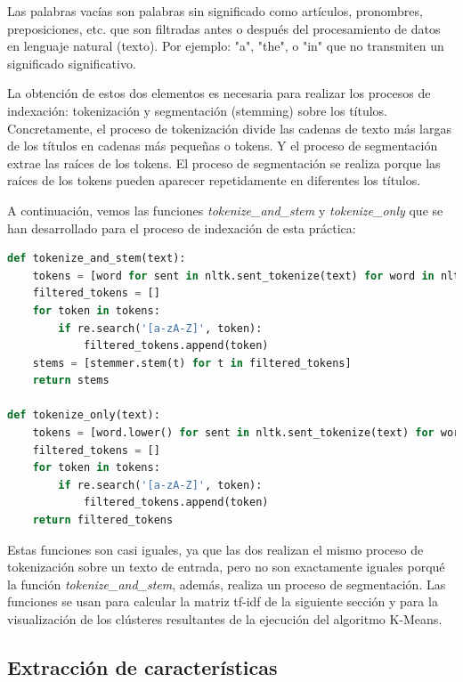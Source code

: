 \documentclass{uimppracticas}
\begin{document}
\begin{definition}\label{palabras_vacías}
	Las palabras vacías son palabras sin significado como artículos, pronombres, preposiciones, etc. que son filtradas antes o después del procesamiento de datos en lenguaje natural (texto). Por ejemplo: "a", "the", o "in" que no transmiten un significado significativo.
\end{definition}

La obtención de estos dos elementos es necesaria para realizar los procesos de indexación: tokenización y segmentación (stemming) sobre los títulos. Concretamente, el proceso de tokenización divide las cadenas de texto más largas de los títulos en cadenas más pequeñas o tokens. Y el proceso de segmentación extrae las raíces de los tokens. El proceso de segmentación se realiza porque las raíces de los tokens pueden aparecer repetidamente en diferentes los títulos.

A continuación, vemos las funciones \textit{tokenize\_and\_stem} y \textit{tokenize\_only} que se han desarrollado para el proceso de indexación de esta práctica: 

\begin{lstlisting}[language=python, basicstyle=\small]
def tokenize_and_stem(text):
	tokens = [word for sent in nltk.sent_tokenize(text) for word in nltk.word_tokenize(sent)]
	filtered_tokens = []
	for token in tokens:
		if re.search('[a-zA-Z]', token):
			filtered_tokens.append(token)
	stems = [stemmer.stem(t) for t in filtered_tokens]
	return stems

def tokenize_only(text):
	tokens = [word.lower() for sent in nltk.sent_tokenize(text) for word in nltk.word_tokenize(sent)]
	filtered_tokens = []
	for token in tokens:
		if re.search('[a-zA-Z]', token):
			filtered_tokens.append(token)
	return filtered_tokens  
\end{lstlisting}

Estas funciones son casi iguales, ya que las dos realizan el mismo proceso de tokenización sobre un texto de entrada, pero no son exactamente iguales porqué la función \textit{tokenize\_and\_stem}, además, realiza un proceso de segmentación. Las funciones se usan para calcular la matriz tf-idf de la siguiente sección y para la visualización de los clústeres resultantes de la ejecución del algoritmo K-Means.

\subsection{Extracción de características}\label{características}
\end{document}
